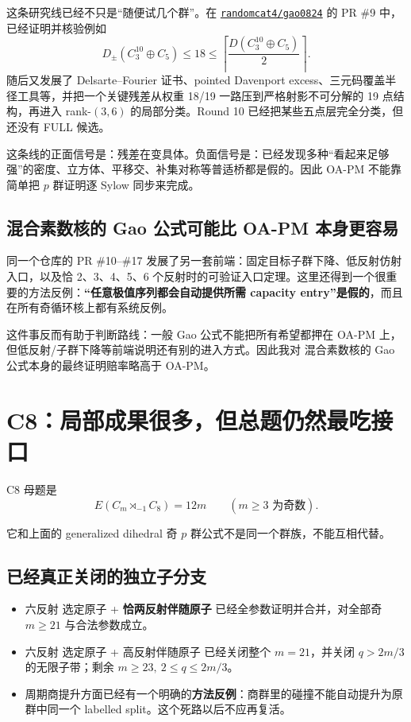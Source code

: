 \documentclass[11pt,a4paper]{ctexart}
\newcommand{\repo}[2]{\href{#2}{\texttt{#1}}}
\begin{document}
这条研究线已经不只是“随便试几个群”。在 \repo{randomcat4/gao0824}{https://github.com/randomcat4/gao0824} 的 PR \#9 中，已经证明并核验例如
\[
D_{\pm}(C_3^{10}\oplus C_5)
\le18
\le\left\lceil\frac{D(C_3^{10}\oplus C_5)}2\right\rceil.
\]
随后又发展了 Delsarte--Fourier 证书、pointed Davenport excess、三元码覆盖半径工具等，并把一个关键残差从权重 18/19 一路压到严格射影不可分解的 19 点结构，再进入 rank-$(3,6)$ 的局部分类。Round 10 已经把某些五点层完全分类，但还没有 FULL 候选。

这条线的正面信号是：残差在变具体。负面信号是：已经发现多种“看起来足够强”的密度、立方体、平移交、补集对称等普适桥都是假的。因此 OA-PM 不能靠简单把 $p$ 群证明逐 Sylow 同步来完成。

\subsection{混合素数核的 Gao 公式可能比 OA-PM 本身更容易}

同一个仓库的 PR \#10--\#17 发展了另一套前端：固定目标子群下降、低反射仿射入口，以及恰 2、3、4、5、6 个反射时的可验证入口定理。这里还得到一个很重要的方法反例：\textbf{“任意极值序列都会自动提供所需 capacity entry”是假的}，而且在所有奇循环核上都有系统反例。

这件事反而有助于判断路线：一般 Gao 公式不能把所有希望都押在 OA-PM 上，但低反射/子群下降等前端说明还有别的进入方式。因此我对 混合素数核的 Gao 公式本身的最终证明赔率略高于 OA-PM。

\section{C8：局部成果很多，但总题仍然最吃接口}

C8 母题是
\[
E(C_m\rtimes_{-1}C_8)=12m\qquad(m\ge3\text{ 为奇数}).
\]

它和上面的 generalized dihedral 奇 $p$ 群公式不是同一个群族，不能互相代替。

\subsection{已经真正关闭的独立子分支}

\begin{itemize}
\item 六反射 选定原子 + \textbf{恰两反射伴随原子} 已经全参数证明并合并，对全部奇 $m\ge21$ 与合法参数成立。
\item 六反射 选定原子 + 高反射伴随原子 已经关闭整个 $m=21$，并关闭 $q>2m/3$ 的无限子带；剩余 $m\ge23,\ 2\le q\le2m/3$。
\item 周期商提升方面已经有一个明确的\textbf{方法反例}：商群里的碰撞不能自动提升为原群中同一个 labelled split。这个死路以后不应再复活。
\end{itemize}
\end{document}
